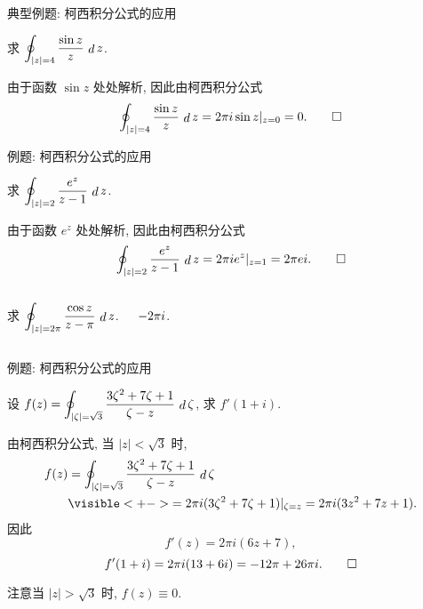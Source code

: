 \begin{frame}{典型例题: 柯西积分公式的应用}
\begin{example}
求 $\displaystyle\oint_{|z|=4}\frac{\sin z}z\,\mathop{d} z$.
\end{example}
\begin{solution}
由于函数 $\sin z$ 处处解析,
\onslide<+->
因此由柯西积分公式
\[\oint_{|z|=4}\frac{\sin z}z\,\mathop{d} z
=2\pi i \sin z|_{z=0}=0.\qedhere\]
\end{solution}
\end{frame}


\begin{frame}[<*>]{例题: 柯西积分公式的应用}
\onslide<+->
\begin{example}
求 $\displaystyle\oint_{|z|=2}\frac{e^z}{z-1}\,\mathop{d} z$.
\end{example}

\onslide<+->
\begin{solution}
由于函数 $e^z$ 处处解析,
\onslide<+->
因此由柯西积分公式
\[\oint_{|z|=2}\frac{e^z}{z-1}\,\mathop{d} z
=2\pi i e^z|_{z=1}=2\pi ei.\qedhere\]
\end{solution}

\onslide<+->
\begin{columns}
		\begin{exercise}
		求 $\displaystyle\oint_{|z|=2\pi}\frac{\cos z}{z-\pi}\,\mathop{d} z$.
		\end{exercise}\onslide<+->
		\begin{answer}
		$-2\pi i\vphantom{\displaystyle\oint_{|z|=2\pi}\frac{\cos z}{z-\pi}\diff z}$.
		\end{answer}
\end{columns}
\end{frame}


\begin{frame}{例题: 柯西积分公式的应用}
\beqskip{5pt}
\begin{example}
设 $f(z)=\displaystyle\oint_{|\zeta|=\sqrt3}\frac{3\zeta^2+7\zeta+1}{\zeta-z}\,\mathop{d} \zeta$, 求 $f'(1+i)$.
\end{example}
\begin{solution}
由柯西积分公式, 当 $|z|<\sqrt3$ 时,
\begin{align*}
f(z)&=\oint_{|\zeta|=\sqrt3}\frac{3\zeta^2+7\zeta+1}{\zeta-z}\diff \zeta\\
&\visible<+->{=2\pi i(3\zeta^2+7\zeta+1)|_{\zeta=z}=2\pi i(3z^2+7z+1).}
\end{align*}
\onslide<+->
因此
\vspace{-\baselineskip}
\[f'(z)=2\pi i(6z+7),\]
\vspace{-\baselineskip}
\onslide<+->
\[f'(1+i)=2\pi i(13+6i)=-12\pi+26\pi i.\qedhere\]
\end{solution}
\onslide<+->
注意当 $|z|>\sqrt3$ 时, $f(z)\equiv0$.
\endgroup
\end{frame}



